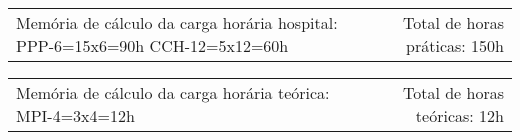 {\fontsize{10pt}{12pt}\selectfont
\noindent
\begin{tabularx}{\linewidth}{@{}X r@{}}
Memória de cálculo da carga horária hospital:
PPP-6=15x6=90h
CCH-12=5x12=60h&
Total de horas práticas: 150h\\
\end{tabularx}
\noindent
\begin{tabularx}{\linewidth}{@{}X r@{}}
Memória de cálculo da carga horária teórica: 
MPI-4=3x4=12h &
Total de horas teóricas: 12h
\end{tabularx}
}